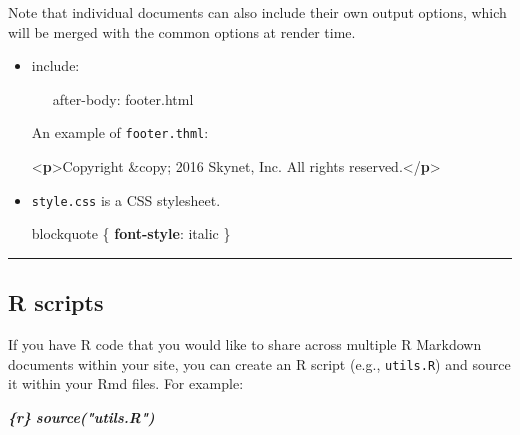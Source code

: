 \documentclass[
  a4paper,
  twoside,
  openright]{book}
\newenvironment{Shaded}{\begin{snugshade}}{\end{snugshade}}
\newcommand{\CharTok}[1]{\textcolor[rgb]{0.31,0.60,0.02}{#1}}
\newcommand{\DataTypeTok}[1]{\textcolor[rgb]{0.13,0.29,0.53}{#1}}
\newcommand{\DecValTok}[1]{\textcolor[rgb]{0.00,0.00,0.81}{#1}}
\newcommand{\InformationTok}[1]{\textcolor[rgb]{0.56,0.35,0.01}{\textbf{\textit{#1}}}}
\newcommand{\KeywordTok}[1]{\textcolor[rgb]{0.13,0.29,0.53}{\textbf{#1}}}
\newcommand{\NormalTok}[1]{#1}
\theoremstyle{definition}
\theoremstyle{definition}
\theoremstyle{definition}
\theoremstyle{definition}
\theoremstyle{remark}
\begin{document}
\begin{itemize}
  Note that individual documents can also include their own output options, which will be merged with the common options at render time.

  \begin{itemize}
  \item
    include:\\
    \strut ~~~after-body: footer.html

    An example of \texttt{footer.thml}:

\begin{Shaded}
\begin{Highlighting}[]
\DataTypeTok{\textless{}}\KeywordTok{p}\DataTypeTok{\textgreater{}}\NormalTok{Copyright }\DecValTok{\&copy;}\NormalTok{ 2016 Skynet, Inc. All rights reserved.}\DataTypeTok{\textless{}/}\KeywordTok{p}\DataTypeTok{\textgreater{}}
\end{Highlighting}
\end{Shaded}
  \item
    \texttt{style.css} is a CSS stylesheet.

\begin{Shaded}
\begin{Highlighting}[]
\NormalTok{blockquote \{}
  \KeywordTok{font{-}style}\CharTok{:} \DecValTok{italic}
\NormalTok{\}}
\end{Highlighting}
\end{Shaded}
  \end{itemize}
\end{itemize}

\begin{center}\rule{0.5\linewidth}{0.5pt}\end{center}

\subsection*{R scripts}\label{r-scripts}

If you have R code that you would like to share across multiple R Markdown documents within your site, you can create an R script (e.g., \texttt{utils.R}) and source it within your Rmd files. For example:

\begin{Shaded}
\begin{Highlighting}[]
\InformationTok{\textasciigrave{}\textasciigrave{}\textasciigrave{}\{r\}}
\InformationTok{source("utils.R")}
\InformationTok{\textasciigrave{}\textasciigrave{}\textasciigrave{}}
\end{Highlighting}
\end{Shaded}
\end{document}
